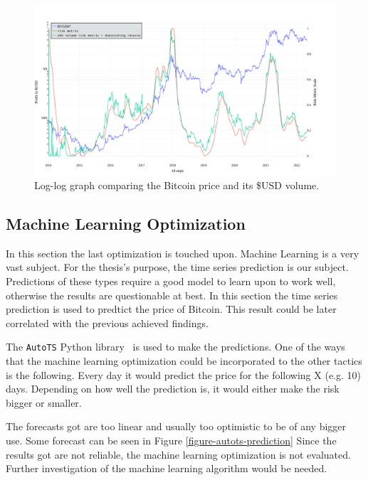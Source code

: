 \begin{figure}[!hbt]
    \centering
    \includegraphics[width=\columnwidth]{figures/24volume-riskmetric-dimreturns.pdf}
    \caption{Log-log graph comparing the Bitcoin price and its \$USD volume.}
    \label{figure-24volume-riskmetric-dimreturns}
\end{figure}


\subsection*{Machine Learning Optimization}
\label{subsection-ml-optimization}

In this section the last optimization is touched upon. Machine Learning is a very vast subject. For the thesis's purpose, the time series prediction is our subject. Predictions of these types require a good model to learn upon to work well, otherwise the results are questionable at best. In this section the time series prediction is used to predtict the price of Bitcoin. This result could be later correlated with the previous achieved findings.

The \texttt{AutoTS} Python library~\cite{autots} is used to make the predictions. One of the ways that the machine learning optimization could be incorporated to the other tactics is the following. Every day it would predict the price for the following X (e.g. 10) days. Depending on how well the prediction is, it would either make the risk bigger or smaller.

The forecasts got are too linear and usually too optimistic to be of any bigger use. Some forecast can be seen in Figure \ref{figure-autots-prediction}
Since the results got are not reliable, the machine learning optimization is not evaluated. Further investigation of the machine learning algorithm would be needed.

